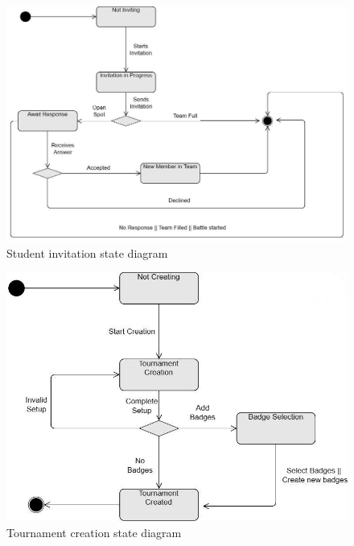 \begin{figure}[H]
    \begin{center}
        \includegraphics[width=0.9\linewidth]{Images/student-invitation.jpg}
        \caption{Student invitation state diagram}
        \label{fig:state_diagram_5}%
    \end{center}
\end{figure}

\begin{figure}[H]
    \begin{center}
        \includegraphics[width=0.9\linewidth]{Images/Tournament_creation.jpg}
        \caption{Tournament creation state diagram}
        \label{fig:state_diagram_2}%
    \end{center}
\end{figure}

